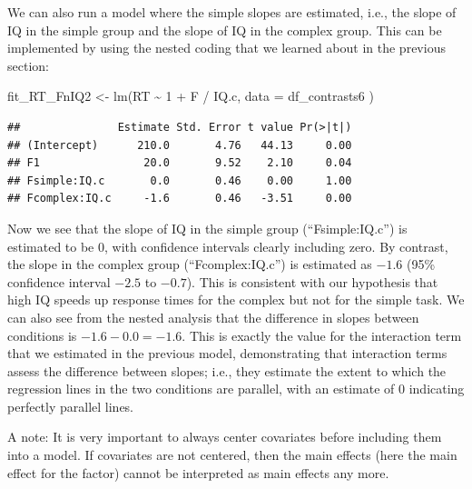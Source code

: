 \documentclass[
  12pt,
]{krantz}
\newenvironment{Shaded}{\begin{snugshade}}{\end{snugshade}}
\newcommand{\AttributeTok}[1]{\textcolor[rgb]{0.77,0.63,0.00}{#1}}
\newcommand{\DecValTok}[1]{\textcolor[rgb]{0.00,0.00,0.81}{#1}}
\newcommand{\FunctionTok}[1]{\textcolor[rgb]{0.00,0.00,0.00}{#1}}
\newcommand{\NormalTok}[1]{#1}
\newcommand{\OtherTok}[1]{\textcolor[rgb]{0.56,0.35,0.01}{#1}}
\newcommand{\SpecialCharTok}[1]{\textcolor[rgb]{0.00,0.00,0.00}{#1}}
\theoremstyle{definition}
\theoremstyle{definition}
\theoremstyle{definition}
\theoremstyle{definition}
\theoremstyle{remark}
\begin{document}
We can also run a model where the simple slopes are estimated, i.e., the slope of IQ in the simple group and the slope of IQ in the complex group. This can be implemented by using the nested coding that we learned about in the previous section:

\begin{Shaded}
\begin{Highlighting}[]
\NormalTok{fit\_RT\_FnIQ2 }\OtherTok{\textless{}{-}} \FunctionTok{lm}\NormalTok{(RT }\SpecialCharTok{\textasciitilde{}} \DecValTok{1} \SpecialCharTok{+}\NormalTok{ F }\SpecialCharTok{/}\NormalTok{ IQ.c,}
  \AttributeTok{data =}\NormalTok{ df\_contrasts6}
\NormalTok{)}
\end{Highlighting}
\end{Shaded}

\begin{Shaded}
\end{Shaded}

\begin{verbatim}
##               Estimate Std. Error t value Pr(>|t|)
## (Intercept)      210.0       4.76   44.13     0.00
## F1                20.0       9.52    2.10     0.04
## Fsimple:IQ.c       0.0       0.46    0.00     1.00
## Fcomplex:IQ.c     -1.6       0.46   -3.51     0.00
\end{verbatim}

Now we see that the slope of IQ in the simple group (``Fsimple:IQ.c'') is estimated to be \(0\), with confidence intervals clearly including zero. By contrast, the slope in the complex group (``Fcomplex:IQ.c'') is estimated as \(-1.6\) (95\% confidence interval \(-2.5\) to \(-0.7\)). This is consistent with our hypothesis that high IQ speeds up response times for the complex but not for the simple task.
We can also see from the nested analysis that the difference in slopes between conditions is \(-1.6 - 0.0 = -1.6\). This is exactly the value for the interaction term that we estimated in the previous model, demonstrating that interaction terms assess the difference between slopes; i.e., they estimate the extent to which the regression lines in the two conditions are parallel, with an estimate of 0 indicating perfectly parallel lines.

A note: It is very important to always center covariates before including them into a model. If covariates are not centered, then the main effects (here the main effect for the factor) cannot be interpreted as main effects any more.
\end{document}
